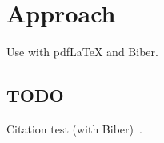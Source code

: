 
\chapter{Approach}\label{chapter:approach}
Use with pdfLaTeX and Biber.

\section{TODO}
Citation test (with Biber)~\parencite{latex}.








